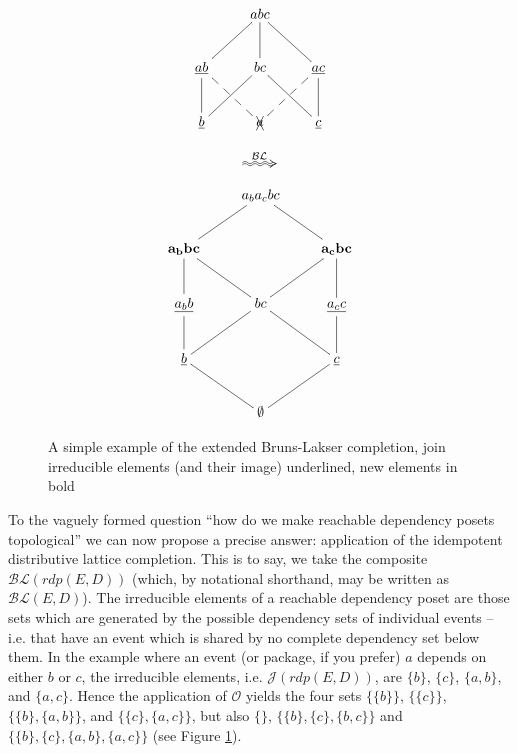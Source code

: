 \documentclass[hoptionsi,review,screen,format=acmsmall]{acmart}
\theoremstyle{definition}
\newcommand{\Oc}{\mathcal{O}}
\newcommand{\Jc}{\mathcal{J}}
\newcommand{\BLc}{\mathcal{BL}}
\begin{document}
\begin{figure}
\begin{minipage}[c]{0.3\textwidth}
\begin{equation*}
    \xymatrix{& abc \ar@{-}[dl] \ar@{-}[d] \ar@{-}[dr] & \\
      \underline{ab} \ar@{-}[d] \ar@{--}[dr] & bc \ar@{-}[dl] \ar@{-}[dr] &
        \underline{ac} \ar@{-}[d] \ar@{--}[dl] \\
        \underline{b} & \xcancel{a}  & \underline{c} }         
\end{equation*}
\end{minipage}
\begin{minipage}[c]{0.08\textwidth}
  \begin{equation*}
    \xymatrix{\ar@2{~>}[r]^{\BLc} &}
  \end{equation*}
\end{minipage}
\begin{minipage}[c]{0.3\textwidth}
\begin{equation*}
    \xymatrix{& a_ba_cbc \ar@{-}[dl]  \ar@{-}[dr] & \\
      \mathbf{a_bbc} \ar@{-}[d] \ar@{-}[dr] & &
        \mathbf{a_cbc} \ar@{-}[d] \ar@{-}[dl]\\
        \underline{a_bb} \ar@{-}[d] & bc \ar@{-}[dl] \ar@{-}[dr] &
          \underline{a_cc} \ar@{-}[d] \\
         \underline{b} \ar@{-}[dr] & & \underline{c} \ar@{-}[dl] \\
      & \mathbf{\emptyset} }
\end{equation*}
\end{minipage}
\caption{A simple example of the extended Bruns-Lakser completion, join irreducible elements (and their image) underlined, new elements in bold}
\label{Fig1}
\end{figure}



To the vaguely formed question ``how do we make reachable dependency posets topological'' we can now propose a precise answer: application of the idempotent distributive lattice completion. This is to say, we take the composite \(\BLc(rdp(E,D))\) (which, by notational shorthand, may be written as \(\BLc(E,D)\)). The irreducible elements of a reachable dependency poset are those sets which are generated by the possible dependency sets of individual events -- i.e. that have an event which is shared by no complete dependency set below them. In the example where an event (or package, if you prefer) \(a\) depends on either \(b\) or \(c\), the irreducible elements, i.e. \(\Jc(rdp(E,D))\), are \(\{b\}\), \(\{c\}\), \(\{a,b\}\), and \(\{a,c\}\). Hence the application of \(\Oc\) yields the four sets \(\{\{b\}\}\), \(\{\{c\}\}\), \(\{\{b\},\{a,b\}\}\), and \(\{\{c\},\{a,c\}\}\), but also \(\{\}\), \(\{\{b\},\{c\},\{b,c\}\}\) and \(\{\{b\},\{c\},\{a,b\},\{a,c\}\}\) (see Figure \ref{Fig1}).
\end{document}
